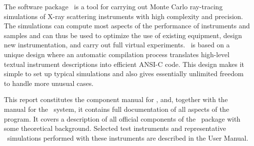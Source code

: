 The software package \MCX\ is a tool for carrying out Monte Carlo
ray-tracing simulations of X-ray scattering instruments with high
complexity and precision. The simulations can compute most aspects of the
performance of instruments and samples
and can thus be used to optimize the use of existing equipment,
design new instrumentation, and carry out full virtual experiments.
\MCX\ is based on a unique design where an automatic compilation process
translates high-level textual instrument descriptions into efficient
ANSI-C code. This design makes it simple to set up typical simulations
and also gives essentially unlimited freedom to handle more unusual
cases.

This report constitutes the component manual for \MCX, and,
together with the manual for the \MCX\ system, it
contains full documentation of all aspects of the program. It covers
a description of all official components of the \MCX\ package with
some theoretical background. Selected test
instruments and representative \MCX\ simulations performed with these
instruments are described in the User Manual.

